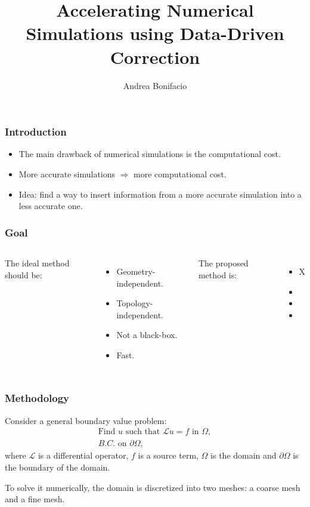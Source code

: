\documentclass{beamer}
\title{Accelerating Numerical Simulations using Data-Driven Correction}
\author{Andrea Bonifacio}
\begin{document}
\begin{frame}
\titlepage
\end{frame}

\begin{frame}
\frametitle{Introduction}
\begin{itemize}
    \item The main drawback of numerical simulations is the computational cost.
    \item More accurate simulations \(\Rightarrow\) more computational cost.
    \item Idea: find a way to insert information from a more accurate simulation into a less accurate one.
\end{itemize}
\end{frame}

\begin{frame}
\frametitle{Goal}
\begin{columns}
    The ideal method should be:
    \begin{itemize}
    \item Geometry-independent.
    \item Topology-independent.
    \item Not a black-box.
    \item Fast.
    \end{itemize}
    The proposed method is:
    \begin{itemize}
    \item[] X
    \item[] \checkmark
    \item[] \checkmark
    \item[] \checkmark
    \end{itemize}
\end{columns}
\end{frame}

\begin{frame}
\frametitle{Methodology}
Consider a general boundary value problem:
\[
    \begin{split}
        \text{Find } u \text{ such that } \mathcal{L}u = f \text{ in } \Omega,\\
        B.C. \text{ on } \partial \Omega,
    \end{split}
\]
where \(\mathcal{L}\) is a differential operator, \(f\) is a source term, \(\Omega\) is the domain and \(\partial \Omega\) is the boundary of the domain. 

\vspace{0.5cm}
To solve it numerically, the domain is discretized into two meshes: a coarse mesh and a fine mesh. 
\end{frame}
\end{document}
